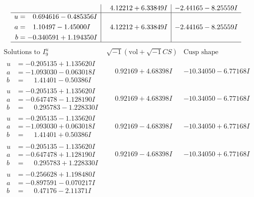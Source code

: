 \documentclass[1p]{elsarticle_modified}
\theoremstyle{definition}
\newcommand{\I}{\sqrt{-1}}
\begin{document}
$$\begin{array}{c|c|c}
 & \phantom{-}4.12212 + 6.33849 I & -2.44165 - 8.25559 I \\ \hline\begin{aligned}
u &= \phantom{-}0.694616 - 0.485356 I \\
a &= \phantom{-}1.10497 - 1.45000 I \\
b &= -0.340591 + 1.194350 I\end{aligned}
 & \phantom{-}4.12212 + 6.33849 I & -2.44165 - 8.25559 I\\
 \hline 
 \end{array}$$\newpage$$\begin{array}{c|c|c}  
\text{Solutions to }I^u_{9}& \I (\text{vol} + \sqrt{-1}CS) & \text{Cusp shape}\\
 \hline 
\begin{aligned}
u &= -0.205135 + 1.135620 I \\
a &= -1.093030 - 0.063018 I \\
b &= \phantom{-}1.41401 - 0.50386 I\end{aligned}
 & \phantom{-}0.92169 + 4.68398 I & -10.34050 - 6.77168 I \\ \hline\begin{aligned}
u &= -0.205135 + 1.135620 I \\
a &= -0.647478 - 1.128190 I \\
b &= \phantom{-}0.295783 - 1.228330 I\end{aligned}
 & \phantom{-}0.92169 + 4.68398 I & -10.34050 - 6.77168 I \\ \hline\begin{aligned}
u &= -0.205135 - 1.135620 I \\
a &= -1.093030 + 0.063018 I \\
b &= \phantom{-}1.41401 + 0.50386 I\end{aligned}
 & \phantom{-}0.92169 - 4.68398 I & -10.34050 + 6.77168 I \\ \hline\begin{aligned}
u &= -0.205135 - 1.135620 I \\
a &= -0.647478 + 1.128190 I \\
b &= \phantom{-}0.295783 + 1.228330 I\end{aligned}
 & \phantom{-}0.92169 - 4.68398 I & -10.34050 + 6.77168 I \\ \hline\begin{aligned}
u &= -0.256628 + 1.198480 I \\
a &= -0.897591 - 0.070217 I \\
b &= \phantom{-}0.47176 - 2.11371 I\end{aligned}

\end{array}$$
\end{document}
